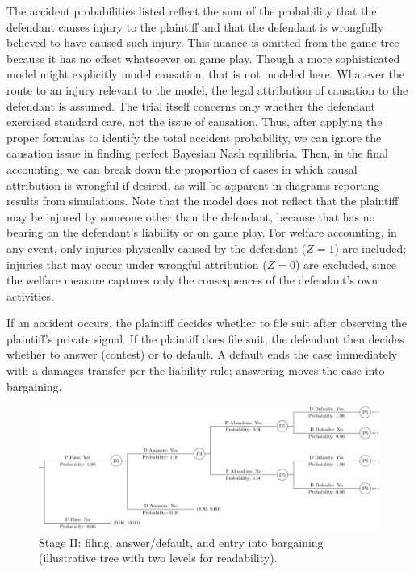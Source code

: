 \documentclass{article}
\begin{document}
The accident probabilities listed reflect the sum of the probability that the defendant causes injury to the plaintiff and that the defendant is wrongfully believed to have caused such injury. This nuance is omitted from the game tree because it has no effect whatsoever on game play. Though a more sophisticated model might explicitly model causation, that is not modeled here. Whatever the route to an injury relevant to the model, the legal attribution of causation to the defendant is assumed. The trial itself concerns only whether the defendant exercised standard care, not the issue of causation. Thus, after applying the proper formulas to identify the total accident probability, we can ignore the causation issue in finding perfect Bayesian Nash equilibria. Then, in the final accounting, we can break down the proportion of cases in which causal attribution is wrongful if desired, as will be apparent in diagrams reporting results from simulations. Note that the model does not reflect that the plaintiff may be injured by someone other than the defendant, because that has no bearing on the defendant's liability or on game play. For welfare accounting, in any event, only injuries physically caused by the defendant ($Z=1$) are included; injuries that may occur under wrongful attribution ($Z=0$) are excluded, since the welfare measure captures only the consequences of the defendant’s own activities.

If an accident occurs, the plaintiff decides whether to file suit after observing the plaintiff's private signal. If the plaintiff does file suit, the defendant then decides whether to answer (contest) or to default. A default ends the case immediately with a damages transfer per the liability rule; answering moves the case into bargaining.

  \begin{figure}[t]
    \centering
    \includegraphics[width=\textwidth]{../Figures/smalltree_mid.pdf}
    \caption{Stage II: filing, answer/default, and entry into bargaining (illustrative tree with two levels for readability).}
    \label{fig:smalltree_mid.pdf}
  \end{figure}
\end{document}
